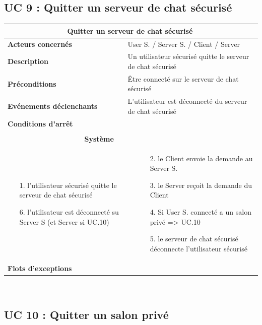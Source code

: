 \documentclass[a4paper,11pt,french]{article}
\newcommand{\fiche}[9] {
	\noindent
\begin{tabular}{|p{3.5cm}| p{1cm} | p{3cm} | p{.5cm} | p{7cm}|} 
\hline
\rowcolor{blue}
\multicolumn{2}{|l|}{\color{white}\bfseries{Nom}} & \multicolumn{3}{l|}{\color{white}\bfseries{#1}}\\
\hline
\multicolumn{2}{|l|}{\bfseries{Acteurs concernés}} & \multicolumn{3}{m{10.5cm}|}{#2}\\
\hline
\multicolumn{2}{|l|}{\bfseries{Description}} & \multicolumn{3}{m{10.5cm}|}{#3}\\
\hline
\multicolumn{2}{|l|}{\bfseries{Préconditions}} & \multicolumn{3}{m{10.5cm}|}{#4}\\
\hline
\multicolumn{2}{|l|}{\bfseries{Evénements déclenchants}} & \multicolumn{3}{m{10.5cm}|}{#5}\\
\hline
\multicolumn{2}{|l|}{\bfseries{Conditions d'arrêt}} & \multicolumn{3}{m{10.5cm}|}{#6}\\
\hline
\rowcolor{gray}
\multicolumn{5}{|c|}{\bfseries{Description du flot d'événements principal}}\\
\hline
\rowcolor{gray}
\multicolumn{3}{|c|}{\bfseries{Acteur(s)}} & \multicolumn{2}{c|}{\bfseries{Système}}\\
\hline
\multicolumn{3}{|p{7.5cm}|}{#7} & \multicolumn{2}{p{7.5cm}|}{#8}\\
\hline
\multicolumn{2}{|l}{\bfseries{Flots d'exceptions}} & \multicolumn{3}{|p{11.5cm}|}{#9}\\
\hline
\end{tabular}
\\
}
\begin{document}
\subsection{UC 9 : Quitter un serveur de chat sécurisé}

\fiche
	{Quitter un serveur de chat sécurisé} %
	{User S. / Server S. / Client / Server} %
	{Un utilisateur sécurisé quitte le serveur de chat sécurisé} %
	{Être connecté sur le serveur de chat sécurisé} %
	{L’utilisateur est déconnecté du serveur de chat sécurisé} %
	{} %
	{\begin{itemize}  %
		\item [1.] l’utilisateur sécurisé quitte le serveur de chat sécurisé
		\item[]  
		\item[]  
		\item[]  
		\item[]  
		\item [6.] l’utilisateur est déconnecté su Server S (et Server si UC.10)
	 \end{itemize}
	} 
	{\begin{itemize}  %
		\item []
		\item [2.] le Client envoie la demande au Server S.
		\item [3.] le Server reçoit la demande du Client
		\item [4.] Si User S. connecté a un salon privé => UC.10
		\item [5.] le serveur de chat sécurisé déconnecte l’utilisateur sécurisé
	 \end{itemize}
	 }
	{} %

\subsection{UC 10 : Quitter un salon privé}
\end{document}
